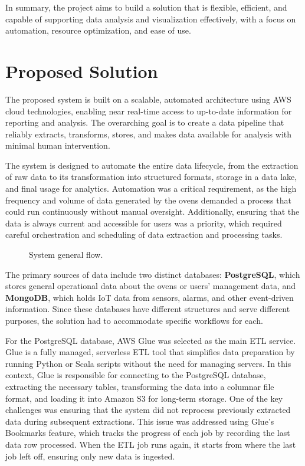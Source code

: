 In summary, the project aims to build a solution that is flexible, efficient, and capable of supporting data analysis and visualization effectively, with a focus on automation, resource optimization, and ease of use.
\section{Proposed Solution}
The proposed system is built on a scalable, automated architecture using \ac{AWS} cloud technologies, enabling near real-time access to up-to-date information for reporting and analysis. The overarching goal is to create a data pipeline that reliably extracts, transforms, stores, and makes data available for analysis with minimal human intervention.

The system is designed to automate the entire data lifecycle, from the extraction of raw data to its transformation into structured formats, storage in a data lake, and final usage for analytics. Automation was a critical requirement, as the high frequency and volume of data generated by the ovens demanded a process that could run continuously without manual oversight. Additionally, ensuring that the data is always current and accessible for users was a priority, which required careful orchestration and scheduling of data extraction and processing tasks.

\begin{figure}[H]
    \centering
    
    \caption{System general flow.}
\end{figure}

The primary sources of data include two distinct databases: \textbf{PostgreSQL}, which stores general operational data about the ovens or users' management data, and \textbf{MongoDB}, which holds IoT data from sensors, alarms, and other event-driven information. Since these databases have different structures and serve different purposes, the solution had to accommodate specific workflows for each.

For the PostgreSQL database, \ac{AWS} Glue was selected as the main \ac{ETL} service. Glue is a fully managed, serverless \ac{ETL} tool that simplifies data preparation by running Python or Scala scripts without the need for managing servers. In this context, Glue is responsible for connecting to the PostgreSQL database, extracting the necessary tables, transforming the data into a columnar file format, and loading it into Amazon S3 for long-term storage. One of the key challenges was ensuring that the system did not reprocess previously extracted data during subsequent extractions. This issue was addressed using Glue’s Bookmarks feature, which tracks the progress of each job by recording the last data row processed. When the \ac{ETL} job runs again, it starts from where the last job left off, ensuring only new data is ingested.

